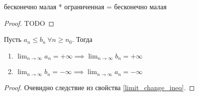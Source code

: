 \begin{theorem}

    бесконечно малая * ограниченная = бесконечно малая
\end{theorem}
\begin{proof}
    TODO
\end{proof}

\begin{theorem}
    Пусть $ a_n \leq  b_n \ \forall n \geq n_0$. Тогда \begin{enumerate}
        \item $ \lim_{n \to  \infty} a_n = +\infty \implies \lim_{n \to \infty} b_n = + \infty $
        \item $ \lim_{n \to  \infty} b_n = -\infty \implies  \lim_{n \to \infty}a_n = - \infty$
    \end{enumerate}
\end{theorem}
\begin{proof}
    Очевидно следствие из свойства \ref{limit_change_ineq}.
\end{proof}


